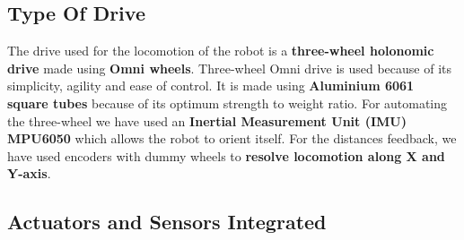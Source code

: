     \subsection{Type Of Drive}
        The drive used for the locomotion of the robot is a \textbf{three-wheel holonomic drive} made using \textbf{Omni wheels}. Three-wheel Omni drive is 
        used because of its simplicity, agility and ease of control. It is made using \textbf{Aluminium 6061 square tubes} because of its optimum 
        strength to weight ratio. For automating the three-wheel we have used an \textbf{Inertial Measurement Unit (IMU) MPU6050} which allows 
        the robot to orient itself. For the distances feedback, we have used encoders with dummy wheels to \textbf{resolve locomotion along X and 
        Y-axis}.



    \subsection{Actuators and Sensors Integrated}

